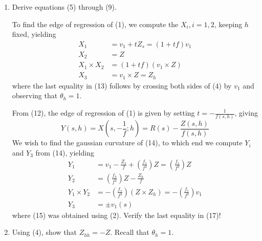 \documentclass{book}
\begin{document}
\begin{enumerate}[1.]
    We now find $\theta (s,h)$. Differentiating (4) with respect to $s$, and using (2) yields
    \begin{align}
      \theta _{s}(s,h) & = - \tau (s) \\
      f(s,h) & = - \kappa \cos \theta
    \end{align}
    from which it follows that
    \begin{equation}
      \theta (s,h) = - \int_{0}^{s} \tau (\sigma) d \sigma + g(h)
    \end{equation}
    where $g(h)$ is to be determined. To this end, we observe that from the fact that $h$ is missing in (5), it follows that
    \begin{equation*}
      ( \theta(s,h_{1}) - \theta(s,h_{2}) )_{s} = 0
    \end{equation*}
    so that
    \begin{equation}
      \theta(s,h_{1}) - \theta(s,h_{2}) = h_{1} - h_{2}
    \end{equation}
    since $\theta (0,h) = h$. As a consequence of (7) and (8), we have, finally, that $\theta _{h}(s,h) = 1$, and
    \begin{equation}
      \theta(s,h) = - \int_{0}^{s} \tau (\sigma) d \sigma + h.
    \end{equation}
  \item Derive equations (5) through (9).

    To find the edge of regression of (1), we compute the $X_{i}, i = 1, 2$, keeping $h$ fixed, yielding
    \begin{align}
      X_{1} & = v_{1} + tZ_{s} = (1 + tf) v_{1} \\
      X_{2} & = Z \\
      X_{1} \times X_{2} & = (1+ tf) (v_{1} \times Z) \\
      X_{3} & = v_{1} \times Z = Z_{h}
    \end{align}
    where the last equality in (13) follows by crossing both sides of (4) by $v_{1}$ and observing that $\theta _{h} = 1$.

    From (12), the edge of regression of (1) is given by setting $t = - \frac{1}{f(s,h)}$, giving
    \begin{equation}
      Y(s,h) = X \left( s, -\frac{1}{f}; h \right) = R(s) - \frac{Z(s,h)}{f(s,h)}
    \end{equation}
    We wish to find the gaussian curvature of (14), to which end we compute $Y_{i}$ and $Y_{3}$ from (14), yielding
    \begin{align}
      Y_{1} & = v_{1} - \frac{Z_{s}}{f} + \left( \frac{f_{s}}{f^{2}} \right) Z = \left( \frac{f_{s}}{f^{2}} \right) Z \\
      Y_{2} & = \left( \frac{f_{h}}{f^{2}} \right) Z - \frac{Z_{h}}{f} \\
      Y_{1} \times Y_{2} & = - \left( \frac{f_{s}}{f^{3}} \right) (Z \times Z_{h}) = - \left( \frac{f_{s}}{f^{3}} \right) v_{1} \\
      Y_{3} & = \pm v_{1}(s)
    \end{align}
    where (15) was obtained using (2). Verify the last equality in (17)!
  \item Using (4), show that $Z_{hh} = - Z$. Recall that $\theta _{h} = 1$.


\end{enumerate}
\end{document}
